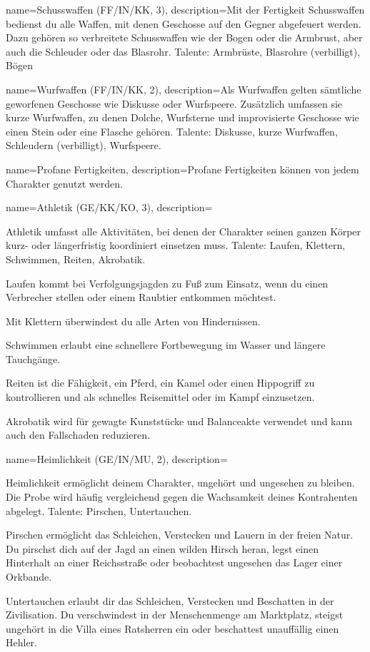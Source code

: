 {
    name={Schusswaffen (FF/IN/KK, 3)},
    description={Mit der Fertigkeit Schusswaffen bedienst du alle Waffen, mit denen Geschosse auf den Gegner abgefeuert werden. Dazu gehören so verbreitete Schusswaffen wie der Bogen oder die Armbrust, aber auch die Schleuder oder das Blasrohr. Talente: Armbrüste, Blasrohre (verbilligt), Bögen}}

{
    name={Wurfwaffen (FF/IN/KK, 2)},
    description={Als Wurfwaffen gelten sämtliche geworfenen Geschosse wie Diskusse oder Wurfspeere. Zusätzlich umfassen sie kurze Wurfwaffen, zu denen Dolche, Wurfsterne und improvisierte Geschosse wie einen Stein oder eine Flasche gehören. Talente: Diskusse, kurze Wurfwaffen, Schleudern (\gls{verbilligt}), Wurfspeere.}}

{
    name={Profane Fertigkeiten},
    description={Profane Fertigkeiten können von jedem Charakter genutzt werden.}}

{
    name={Athletik (GE/KK/KO, 3)},
    description={Athletik umfasst alle Aktivitäten, bei denen der Charakter seinen ganzen Körper kurz- oder längerfristig koordiniert einsetzen muss. Talente: Laufen, Klettern, Schwimmen, Reiten, Akrobatik.
    \begin{description}
\item Laufen kommt bei Verfolgungsjagden zu Fuß zum Einsatz, wenn du einen Verbrecher stellen oder einem Raubtier entkommen möchtest.
\item Mit Klettern überwindest du alle Arten von Hindernissen.
\item Schwimmen erlaubt eine schnellere Fortbewegung im Wasser und längere Tauchgänge.
\item Reiten ist die Fähigkeit, ein Pferd, ein Kamel oder einen Hippogriff zu kontrollieren und als schnelles Reisemittel oder im Kampf einzusetzen.
\item Akrobatik wird für gewagte Kunststücke und Balanceakte verwendet und kann auch den Fallschaden reduzieren.
\end{description}}}

{
    name={Heimlichkeit (GE/IN/MU, 2)},
    description={Heimlichkeit ermöglicht deinem Charakter, ungehört und ungesehen zu bleiben. Die Probe wird häufig vergleichend gegen die Wachsamkeit deines Kontrahenten abgelegt. Talente: Pirschen, Untertauchen.
\begin{description}
\item Pirschen ermöglicht das Schleichen, Verstecken und Lauern in der freien Natur. Du pirschst dich auf der Jagd an einen wilden Hirsch heran, legst einen Hinterhalt an einer Reichsstraße oder beobachtest ungesehen das Lager einer Orkbande.
\item Untertauchen erlaubt dir das Schleichen, Verstecken und Beschatten in der Zivilisation. Du verschwindest in der Menschenmenge am Marktplatz, steigst ungehört in die Villa eines Ratsherren ein oder beschattest unauffällig einen Hehler.
\end{description}}}


